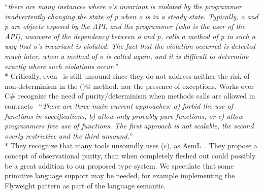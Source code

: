 ``\emph{there are many instances where o's invariant is violated by the programmer inadvertently changing the state
of p when o is in a steady state. Typically, o and p
are objects exposed by the API, and the programmer (who is the user of the API), unaware of
the dependency between o and p, calls a method of p in such a way that
o's invariant is violated. The fact that the violation occurred is detected
much later, when a method of o is called again, and it is difficult to 
determine exactly where such violations occur.}''\\*
Critically, even~\cite{Gopinathan:2008:RMO:1483018.1483028} is still unsound since they do not address neither
the risk of non-determinism in the \Q@invariant()@ method, 
nor the presence of exceptions.
\sepItems
Works over C\# recognize the need
of purity/determinism when methods calls are allowed in contracts~\cite{barnett200499}
``\emph{There are three main current approaches: a) forbid the use of functions in specifications, b) allow only provably pure functions, or c) allow programmers free use
of functions. The first approach is not scalable, the second overly restrictive and
the third unsound.}''\\*
They recognize that many tools unsoundly uses (c), as AsmL~\cite{barnett2003runtime}.
They propose a concept of observational purity, than when completely fleshed out
could possibly be a great addition to our proposed type system. We speculate that some 
primitive language support may be needed, for example implementing the Flyweight pattern 
as part of the language semantic.

